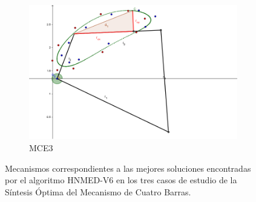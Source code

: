 \begin{figure}
	\begin{subfigure}[b]{0.49\linewidth}
		\includegraphics[width=\linewidth]{Figures/MCE3}
		\caption{MCE3} \label{fig:M3} 
	\end{subfigure}
	
	\caption{Mecanismos correspondientes a las mejores soluciones encontradas por el algoritmo HNMED-V6 en los
		tres casos de estudio de la Síntesis Óptima del Mecanismo de Cuatro Barras.} \label{fig: Mecanismos correspondientes a las mejores soluciones encontradas por el algoritmo HNMED-V6 en los
		tres casos de estudio de la Síntesis Óptima del Mecanismo de Cuatro Barras.} 
	
\end{figure}					
